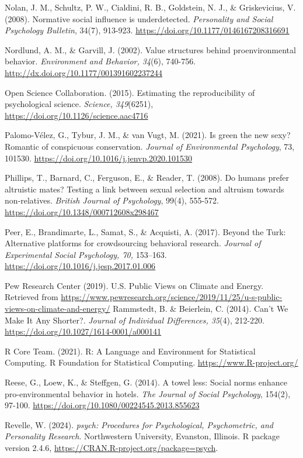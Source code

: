 \documentclass[
]{article}
\begin{document}
Nolan, J. M., Schultz, P. W., Cialdini, R. B., Goldstein, N. J., \&
Griskevicius, V. (2008). Normative social influence is underdetected.
\emph{Personality and Social Psychology Bulletin}, 34(7), 913-923.
\url{https://doi.org/10.1177/0146167208316691}

Nordlund, A. M., \& Garvill, J. (2002). Value structures behind
proenvironmental behavior. \emph{Environment and Behavior, 34}(6),
740-756. \url{http://dx.doi.org/10.1177/001391602237244}

Open Science Collaboration. (2015). Estimating the reproducibility of
psychological science. \emph{Science, 349}(6251),
\url{https://doi.org/10.1126/science.aac4716}

Palomo-Vélez, G., Tybur, J. M., \& van Vugt, M. (2021). Is green the new
sexy? Romantic of conspicuous conservation. \emph{Journal of
Environmental Psychology}, 73, 101530.
\url{https://doi.org/10.1016/j.jenvp.2020.101530}

Phillips, T., Barnard, C., Ferguson, E., \& Reader, T. (2008). Do humans
prefer altruistic mates? Testing a link between sexual selection and
altruism towards non‐relatives. \emph{British Journal of Psychology},
99(4), 555-572. \url{https://doi.org/10.1348/000712608x298467}

Peer, E., Brandimarte, L., Samat, S., \& Acquisti, A. (2017). Beyond the
Turk: Alternative platforms for crowdsourcing behavioral research.
\emph{Journal of Experimental Social Psychology, 70,} 153--163.
\url{https://doi.org/10.1016/j.jesp.2017.01.006}

Pew Research Center (2019). U.S. Public Views on Climate and Energy.
Retrieved from
\url{https://www.pewresearch.org/science/2019/11/25/u-s-public-views-on-climate-and-energy/}
Rammstedt, B. \& Beierlein, C. (2014). Can't We Make It Any Shorter?.
\emph{Journal of Individual Differences, 35}(4), 212-220.
\url{https://doi.org/10.1027/1614-0001/a000141}

R Core Team. (2021). R: A Language and Environment for Statistical
Computing. R Foundation for Statistical Computing.
\url{https://www.R-project.org/}

Reese, G., Loew, K., \& Steffgen, G. (2014). A towel less: Social norms
enhance pro-environmental behavior in hotels. \emph{The Journal of
Social Psychology}, 154(2), 97-100.
\url{https://doi.org/10.1080/00224545.2013.855623}

Revelle, W. (2024). \emph{psych: Procedures for Psychological,
Psychometric, and Personality Research}. Northwestern University,
Evanston, Illinois. R package version 2.4.6,
\url{https://CRAN.R-project.org/package=psych}.
\end{document}
